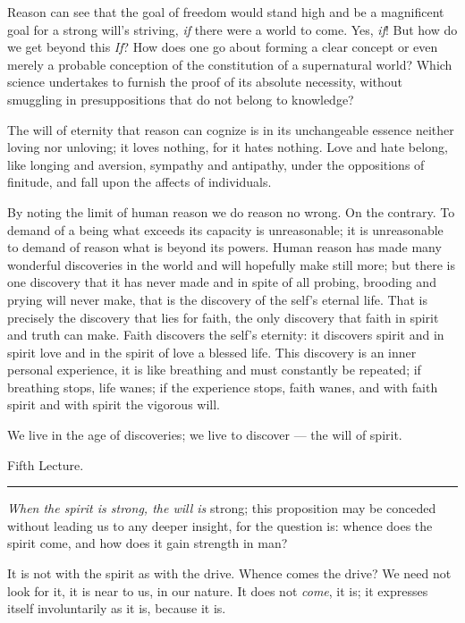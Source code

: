 \documentclass[12pt,a4paper,openany]{book}
\newcommand{\opage}[1]{\marginnote{\footnotesize\textit{[#1]}}}
\newcommand{\lecture}[1]{\clearpage\begin{center}{\large #1}\\[0.4em]\rule{3em}{0.4pt}\end{center}\medskip\noindent}
\begin{document}
Reason can see that the goal of freedom would stand high and be a magnificent goal for a strong will's striving, \emph{if}
there were a world to come. Yes, \emph{if}! But how do we get beyond this \emph{If}? How does one go about forming a clear
concept or even merely a probable conception of the constitution of a supernatural world? Which science undertakes to furnish
the proof of its absolute necessity, without smuggling in presuppositions that do not belong to knowledge?

The will of eternity that reason can cognize is in its unchangeable essence neither loving nor unloving; it loves nothing, for
it hates nothing. Love and hate belong, like longing and aversion, sympathy and antipathy, under the oppositions of finitude,
and fall upon the affects of individuals.

By noting the limit of human reason we do reason no wrong. On the contrary. To demand of a being what exceeds its capacity is
unreasonable; it is unreasonable to demand of reason what is beyond its powers. Human reason has made many wonderful
discoveries in the world and will hopefully make still more; but there is one discovery that it has never made and in spite of
all probing, brooding and prying will never make, that is the discovery of the self's eternal life.
\setcounter{footnote}{0}%
\opage{47}That is precisely the discovery that lies for faith, the only discovery that faith in spirit and truth can make. Faith
discovers the self's eternity: it discovers spirit and in spirit love and in the spirit of love a blessed life. This
discovery is an inner personal experience, it is like breathing and must constantly be repeated; if breathing stops, life
wanes; if the experience stops, faith wanes, and with faith spirit and with spirit the vigorous will.

We live in the age of discoveries; we live to discover
--- the will of spirit.

\setcounter{footnote}{0}%
\lecture{Fifth Lecture.}\opage{48}

\emph{When the spirit is strong, the will is} strong;
this proposition may be conceded without leading us
to any deeper insight, for the question is: whence
does the spirit come, and how does it gain strength
in man?

It is not with the spirit as with the drive. Whence
comes the drive? We need not look for it, it is
near to us, in our nature. It does not \emph{come}, it
is; it expresses itself involuntarily as it is, because it is.
\end{document}
